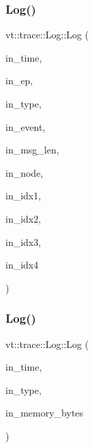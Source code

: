 \mbox{\label{structvt_1_1trace_1_1_log_ab48521fa03009ac8033116f7f06b195b}} 
\subsubsection{\texorpdfstring{Log()}{Log()}\hspace{0.1cm}{\footnotesize\ttfamily [10/11]}}
{\footnotesize\ttfamily vt\+::trace\+::\+Log\+::\+Log (\begin{DoxyParamCaption}\item[{double}]{in\+\_\+time,  }\item[{\hyperlink{namespacevt_1_1trace_a3c14050715ba9eceaeff51fb3de64f2f}{Trace\+Entry\+I\+D\+Type}}]{in\+\_\+ep,  }\item[{\hyperlink{namespacevt_1_1trace_acf454dfbd581b0ebae895f90b5927a1d}{Trace\+Constants\+Type}}]{in\+\_\+type,  }\item[{\hyperlink{namespacevt_1_1trace_a64a7185f3e102df8d8258f263ccd1582}{Trace\+Event\+I\+D\+Type}}]{in\+\_\+event,  }\item[{\hyperlink{namespacevt_1_1trace_aeb598f45d67d41db7902e494f2f0ce59}{Trace\+Msg\+Len\+Type}}]{in\+\_\+msg\+\_\+len,  }\item[{\hyperlink{namespacevt_a866da9d0efc19c0a1ce79e9e492f47e2}{Node\+Type}}]{in\+\_\+node,  }\item[{uint64\+\_\+t}]{in\+\_\+idx1,  }\item[{uint64\+\_\+t}]{in\+\_\+idx2,  }\item[{uint64\+\_\+t}]{in\+\_\+idx3,  }\item[{uint64\+\_\+t}]{in\+\_\+idx4 }\end{DoxyParamCaption})\hspace{0.3cm}{\ttfamily [inline]}}

\mbox{\label{structvt_1_1trace_1_1_log_aaa26486d549d2e6792603318813d4e83}} 
\subsubsection{\texorpdfstring{Log()}{Log()}\hspace{0.1cm}{\footnotesize\ttfamily [11/11]}}
{\footnotesize\ttfamily vt\+::trace\+::\+Log\+::\+Log (\begin{DoxyParamCaption}\item[{double}]{in\+\_\+time,  }\item[{\hyperlink{namespacevt_1_1trace_acf454dfbd581b0ebae895f90b5927a1d}{Trace\+Constants\+Type}}]{in\+\_\+type,  }\item[{std\+::size\+\_\+t}]{in\+\_\+memory\+\_\+bytes }\end{DoxyParamCaption})\hspace{0.3cm}{\ttfamily [inline]}}



